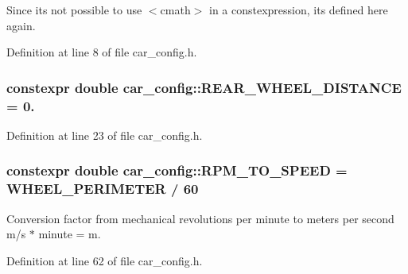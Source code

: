 Since it\textquotesingle{}s not possible to use $<$cmath$>$ in a constexpression, it\textquotesingle{}s defined here again. 



Definition at line 8 of file car\+\_\+config.\+h.

\subsubsection[{\texorpdfstring{R\+E\+A\+R\+\_\+\+W\+H\+E\+E\+L\+\_\+\+D\+I\+S\+T\+A\+N\+CE}{REAR_WHEEL_DISTANCE}}]{\setlength{\rightskip}{0pt plus 5cm}constexpr double car\+\_\+config\+::\+R\+E\+A\+R\+\_\+\+W\+H\+E\+E\+L\+\_\+\+D\+I\+S\+T\+A\+N\+CE = 0.}\hypertarget{namespacecar__config_a43e668702c6dc662ff95f80047ee5500}{}\label{namespacecar__config_a43e668702c6dc662ff95f80047ee5500}


Definition at line 23 of file car\+\_\+config.\+h.

\subsubsection[{\texorpdfstring{R\+P\+M\+\_\+\+T\+O\+\_\+\+S\+P\+E\+ED}{RPM_TO_SPEED}}]{\setlength{\rightskip}{0pt plus 5cm}constexpr double car\+\_\+config\+::\+R\+P\+M\+\_\+\+T\+O\+\_\+\+S\+P\+E\+ED = {\bf W\+H\+E\+E\+L\+\_\+\+P\+E\+R\+I\+M\+E\+T\+ER} / 60}\hypertarget{namespacecar__config_aee034b6adfd7932f245bc94d869f2bb6}{}\label{namespacecar__config_aee034b6adfd7932f245bc94d869f2bb6}


Conversion factor from mechanical revolutions per minute to meters per second  m/s $\ast$ minute = m. 



Definition at line 62 of file car\+\_\+config.\+h.

